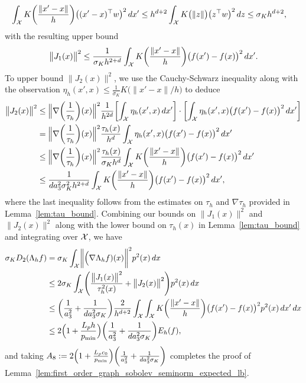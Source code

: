 \begin{align*}
\int_{\mathcal{X}}K\biggl(\frac{\|x' - x\|}{h}\biggr)\bigl((x' - x)^{\top} w\bigr)^2\,dx' & \leq h^{d + 2} \int_{\mathcal{X}} K\bigl(\|z\|\bigr) \bigl(z^{\top} w\bigr)^2 \,dz \leq \sigma_K h^{d + 2},
\end{align*}
with the resulting upper bound
\begin{equation*}
\bigl\|J_1(x)\bigr\|^2 \leq \frac{1}{\sigma_K h^{2 + d}} \int_{\mathcal{X}}K\biggl(\frac{\|x' - x\|}{h}\biggr)\bigl(f(x') - f(x)\bigr)^2\,dx'.
\end{equation*}
To upper bound $\bigl\|J_2(x)\bigr\|^2$, we use the Cauchy-Schwarz inequality along with the observation $\eta_h(x',x) \leq \frac{1}{\sigma_K} K\bigl(\|x' - x\|/h\bigr)$ to deduce
\begin{align*}
\bigl\|J_2(x)\bigr\|^2 & \leq \Bigl\|\nabla\biggl(\frac{1}{\tau_h}\biggr)(x)\Bigr\|^2\frac{1}{h^{2d}} \biggl[\int_{\mathcal{X}}\eta_h(x',x) \,dx'\biggr] \cdot \biggl[\int_{\mathcal{X}} \eta_h(x',x)\bigl(f(x') - f(x)\bigr)^2 \,dx' \biggr] \\
& = \Bigl\|\nabla\biggl(\frac{1}{\tau_h}\biggr)(x)\Bigr\|^2\frac{\tau_h(x)}{h^d} \int_{\mathcal{X}} \eta_h(x',x)\bigl(f(x') - f(x)\bigr)^2 \,dx'\\ 
& \leq \Bigl\|\nabla\biggl(\frac{1}{\tau_h}\biggr)(x)\Bigr\|^2\frac{\tau_h(x)}{\sigma_K h^d}\int_{\mathcal{X}} K\biggl(\frac{\|x' - x\|}{h}\biggr)\bigl(f(x') - f(x)\bigr)^2 \,dx' \\
& \leq \frac{1}{da_3^2\sigma_K^2h^{2 + d}} \int_{\mathcal{X}} K\biggl(\frac{\|x' - x\|}{h}\biggr)\bigl(f(x') - f(x)\bigr)^2 \,dx',
\end{align*}
where the last inequality follows from the estimates on $\tau_h$ and $\nabla \tau_h$ provided in Lemma~\ref{lem:tau_bound}. Combining our bounds on $\bigl\|J_1(x)\bigr\|^2$ and $\bigl\|J_2(x)\bigr\|^2$ along with the lower bound on $\tau_h(x)$ in Lemma~\ref{lem:tau_bound} and integrating over $\mathcal{X}$, we have
\begin{align*}
\sigma_K D_2(\Lambda_h f) & = \sigma_K\int_{\mathcal{X}} \biggl\|\Bigl(\nabla \Lambda_hf)(x)\biggr\|^2 p^2(x) \,dx \\
& \leq 2 \sigma_K \int_{\mathcal{X}} \Biggl(\frac{\bigl\|J_1(x)\bigr\|^2}{\tau_h^2(x)} + \bigl\|J_2(x)\bigr\|^2\Biggr) p^2(x) \,dx \\
& \leq \biggl(\frac{1}{a_3^2} + \frac{1}{da_3^2\sigma_K}\biggr)\frac{2}{h^{d + 2}} \int_{\mathcal{X}} \int_{\mathcal{X}} K\biggl(\frac{\|x' - x\|}{h}\biggr)\bigl(f(x') - f(x)\bigr)^2 p^2(x) \,dx' \,dx \\
& \leq 2 \Bigl(1 + \frac{L_ph}{p_{\min}}\Bigr) \biggl(\frac{1}{a_3^2} + \frac{1}{da_3^2\sigma_K}\biggr) E_h(f),
\end{align*}
and taking $A_8 := 2 \Bigl(1 + \frac{L_pc_0}{p_{\min}}\Bigr) \biggl(\frac{1}{a_3^2} + \frac{1}{da_3^2\sigma_K}\biggr)$ completes the proof of Lemma~\ref{lem:first_order_graph_sobolev_seminorm_expected_lb}. 

